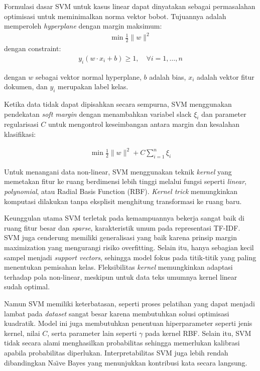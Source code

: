Formulasi dasar SVM untuk kasus linear dapat dinyatakan sebagai permasalahan optimisasi untuk meminimalkan norma vektor bobot. Tujuannya adalah memperoleh \textit{hyperplane} dengan margin maksimum:
\begin{align}
\min \frac{1}{2} \lVert w \rVert^2 \label{eq=rumus-svm}
\end{align}
dengan constraint:
\begin{align}
y_i (w \cdot x_i + b) \ge 1,\quad \forall i = 1, \ldots, n \label{eq=rumus-constraint-svm}
\end{align}

dengan $w$ sebagai vektor normal hyperplane, $b$ adalah bias, $x_i$ adalah vektor fitur dokumen, dan $y_i$ merupakan label kelas.

Ketika data tidak dapat dipisahkan secara sempurna, SVM menggunakan pendekatan \textit{soft margin} dengan menambahkan variabel slack $\xi_i$ dan parameter regularisasi $C$ untuk mengontrol keseimbangan antara margin dan kesalahan klasifikasi:

\begin{align}
\min \frac{1}{2} \lVert w \rVert^2 + C \sum_{i=1}^{n} \xi_i \label{eq=rumus-soft-margin-svm}
\end{align}

Untuk menangani data non-linear, SVM menggunakan teknik \textit{kernel} yang memetakan fitur ke ruang berdimensi lebih tinggi melalui fungsi seperti \textit{linear}, \textit{polynomial}, atau Radial Basis Function (RBF). \textit{Kernel trick} memungkinkan komputasi dilakukan tanpa eksplisit menghitung transformasi ke ruang baru.

Keunggulan utama SVM terletak pada kemampuannya bekerja sangat baik di ruang fitur besar dan \textit{sparse}, karakteristik umum pada representasi TF-IDF. SVM juga cenderung memiliki generalisasi yang baik karena prinsip margin maximization yang mengurangi risiko overfitting. Selain itu, hanya sebagian kecil sampel menjadi \textit{support vectors}, sehingga model fokus pada titik-titik yang paling menentukan pemisahan kelas. Fleksibilitas \textit{kernel} memungkinkan adaptasi terhadap pola non-linear, meskipun untuk data teks umumnya kernel linear sudah optimal.

Namun SVM memiliki keterbatasan, seperti proses pelatihan yang dapat menjadi lambat pada \textit{dataset} sangat besar karena membutuhkan solusi optimisasi kuadratik. Model ini juga membutuhkan penentuan hiperparameter seperti jenis kernel, nilai $C$, serta parameter lain seperti $\gamma$ pada kernel RBF. Selain itu, SVM tidak secara alami menghasilkan probabilitas sehingga memerlukan kalibrasi apabila probabilitas diperlukan. Interpretabilitas SVM juga lebih rendah dibandingkan Na\"{\i}ve Bayes yang menunjukkan kontribusi kata secara langsung.

